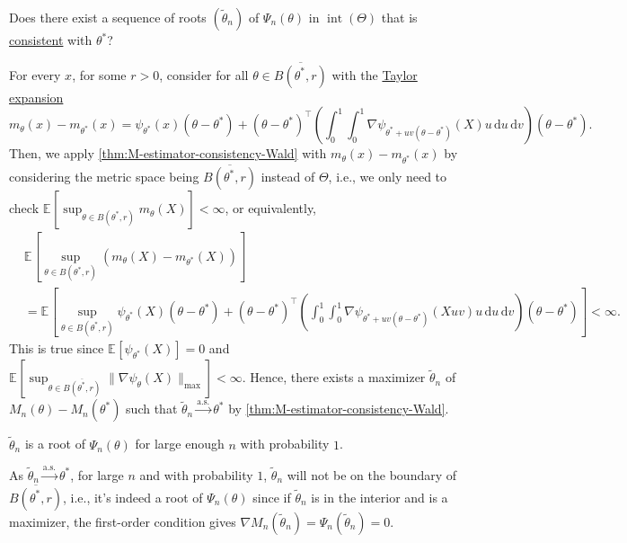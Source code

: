 \begin{problem*}
	Does there exist a sequence of roots \((\widetilde{\theta} _n)\) of \(\Psi _n(\theta )\) in \(\operatorname{int}(\Theta ) \) that is \hyperref[def:consistent]{consistent} with \(\theta ^{\ast} \)?
\end{problem*}
\begin{answer}
	For every \(x\), for some \(r > 0\), consider for all \(\theta \in \overline{B(\theta ^{\ast} , r )} \) with the \hyperref[note:lec10]{Taylor expansion}
	\[
		m_\theta (x) - m_{\theta ^{\ast} }(x)
		= \psi _{\theta ^{\ast} }(x) (\theta - \theta ^{\ast} ) + (\theta - \theta ^{\ast} )^{\top} \left( \int_{0}^{1} \int_{0}^{1} \nabla \psi _{\theta ^{\ast} + uv(\theta - \theta ^{\ast} )} (X) u \,\mathrm{d}u \,\mathrm{d}v \right) (\theta - \theta ^{\ast} ).
	\]
	Then, we apply \autoref{thm:M-estimator-consistency-Wald} with \(m_\theta (x) - m_{\theta ^{\ast} }(x)\) by considering the metric space being \(\overline{B(\theta ^{\ast} , r )} \) instead of \(\Theta \), i.e., we only need to check \(\mathbb{E}_{}[\sup _{\theta \in B(\theta ^{\ast} , r ) } m_\theta (X)] < \infty\), or equivalently,
	\[
		\begin{split}
			 & \mathbb{E}_{}\left[\sup _{\theta \in B(\theta ^{\ast} , r )} (m_\theta (X) - m_{\theta ^{\ast} }(X))\right]                                                                                                                                                                                                                            \\
			 & = \mathbb{E}_{}\left[\sup _{\theta \in B(\theta ^{\ast} , r )} \psi _{\theta ^{\ast} }(X) (\theta - \theta ^{\ast} ) + (\theta - \theta ^{\ast} )^{\top} \left( \int_{0}^{1} \int_{0}^{1} \nabla \psi _{\theta ^{\ast} + uv(\theta - \theta ^{\ast} )} (X uv) u \,\mathrm{d}u \,\mathrm{d}v \right) (\theta - \theta ^{\ast} ) \right]
			< \infty.
		\end{split}
	\]
	This is true since \(\mathbb{E}_{}[\psi _{\theta ^{\ast} } (X)] = 0\) and \(\mathbb{E}_{}[\sup _{\theta \in \overline{B(\theta ^{\ast} , r )} } \lVert \nabla \psi _\theta (X) \rVert _{\max }] < \infty \). Hence, there exists a maximizer \(\widetilde{\theta} _n\) of \(M_n(\theta ) - M_n(\theta ^{\ast} )\) such that \(\widetilde{\theta} _n \overset{\text{a.s.} }{\to} \theta ^{\ast} \) by \autoref{thm:M-estimator-consistency-Wald}.

	\begin{claim}
		\(\widetilde{\theta} _n\) is a root of \(\Psi _n(\theta )\) for large enough \(n\) with probability \(1\).
	\end{claim}
	\begin{explanation}
		As \(\widetilde{\theta} _n \overset{\text{a.s.} }{\to} \theta ^{\ast} \), for large \(n\) and with probability \(1\), \(\widetilde{\theta} _n\) will not be on the boundary of \(\overline{B(\theta ^{\ast} , r )} \), i.e., it's indeed a root of \(\Psi _n(\theta )\) since if \(\widetilde{\theta} _n\) is in the interior and is a maximizer, the first-order condition gives \(\nabla M_n(\widetilde{\theta} _n) = \Psi _n(\widetilde{\theta} _n) = 0\).
	\end{explanation}


\end{answer}
